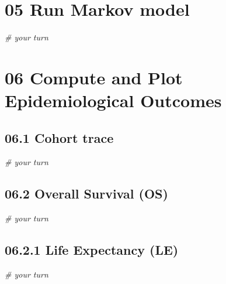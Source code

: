 \documentclass[
]{article}
\newenvironment{Shaded}{\begin{snugshade}}{\end{snugshade}}
\newcommand{\CommentTok}[1]{\textcolor[rgb]{0.56,0.35,0.01}{\textit{#1}}}
\begin{document}
\hypertarget{run-markov-model}{%
\section{05 Run Markov model}\label{run-markov-model}}

\begin{Shaded}
\begin{Highlighting}[]
\CommentTok{# your turn}
\end{Highlighting}
\end{Shaded}

\hypertarget{compute-and-plot-epidemiological-outcomes}{%
\section{06 Compute and Plot Epidemiological
Outcomes}\label{compute-and-plot-epidemiological-outcomes}}

\hypertarget{cohort-trace-1}{%
\subsection{06.1 Cohort trace}\label{cohort-trace-1}}

\begin{Shaded}
\begin{Highlighting}[]
\CommentTok{# your turn}
\end{Highlighting}
\end{Shaded}

\hypertarget{overall-survival-os}{%
\subsection{06.2 Overall Survival (OS)}\label{overall-survival-os}}

\begin{Shaded}
\begin{Highlighting}[]
\CommentTok{# your turn}
\end{Highlighting}
\end{Shaded}

\hypertarget{life-expectancy-le}{%
\subsection{06.2.1 Life Expectancy (LE)}\label{life-expectancy-le}}

\begin{Shaded}
\begin{Highlighting}[]
\CommentTok{# your turn}
\end{Highlighting}
\end{Shaded}
\end{document}
